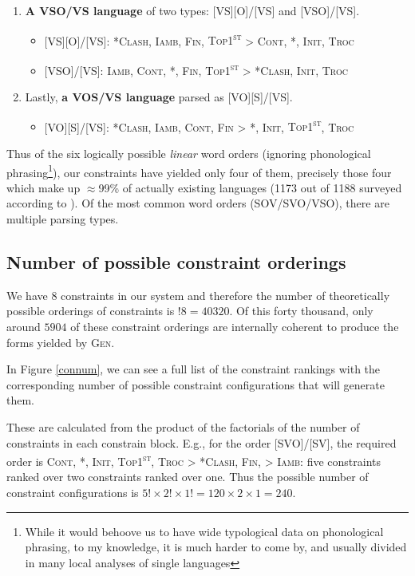 \documentclass{article}
\newcommand{\noclash}{\textsc{*Clash}}
\newcommand{\iamb}{\textsc{Iamb}}
\newcommand{\cont}{\textsc{Cont}}
\newcommand{\topf}{\textsc{Top1\textsuperscript{st}}}
\newcommand{\nophi}{\textsc{*\textphi}}
\newcommand{\finphi}{\textsc{Fin\textphi}}
\newcommand{\initphi}{\textsc{Init\textphi}}
\newcommand{\troc}{\textsc{Troc}}
\begin{document}
\begin{enumerate}
\item \textbf{A VSO/VS language} of two types: [VS][O]/[VS] and [VSO]/[VS].

\begin{itemize}
\item {}[VS][O]/[VS]: \noclash, \iamb, \finphi, {\topf} {\textgreater} \cont, \nophi, \initphi, \troc
\item {}[VSO]/[VS]: \iamb, \cont, \nophi, \finphi, {\topf} {\textgreater} \noclash, \initphi, \troc
\end{itemize}

\item Lastly, \textbf{a VOS/VS language} parsed as [VO][S]/[VS].

\begin{itemize}
\item {}[VO][S]/[VS]: \noclash, \iamb, \cont, {\finphi} {\textgreater} \nophi, \initphi, \topf, \troc
\end{itemize}

\end{enumerate}

Thus of the six logically possible \emph{linear} word orders (ignoring phonological phrasing\footnote{While it would behoove us to have wide typological data on phonological phrasing, to my knowledge, it is much harder to come by, and usually divided in many local analyses of single languages}), our constraints have yielded only four of them, precisely those four which make up $\approx$99\% of actually existing languages (1173 out of 1188 surveyed according to \textcite{dryer13}).
Of the most common word orders (SOV/SVO/VSO), there are multiple parsing types.

\subsection{Number of possible constraint orderings}

We have 8 constraints in our system and therefore the number of theoretically possible orderings of constraints is $!8 = 40320$. Of this forty thousand, only around $5904$ of these constraint orderings are internally coherent to produce the forms yielded by \textsc{Gen}.

In Figure \ref{connum}, we can see a full list of the constraint rankings with the corresponding number of possible constraint configurations that will generate them.

These are calculated from the product of the factorials of the number of constraints in each constrain block.
E.g., for the order
[SVO]/[SV],
the required order is \cont, \nophi, \initphi, \topf, {\troc} {\textgreater} \noclash, {\finphi,} {\textgreater} \iamb: five constraints ranked over two constraints ranked over one. Thus the possible number of constraint configurations is $5! \times 2! \times 1! = 120 \times 2 \times 1 = 240$.
\end{document}
